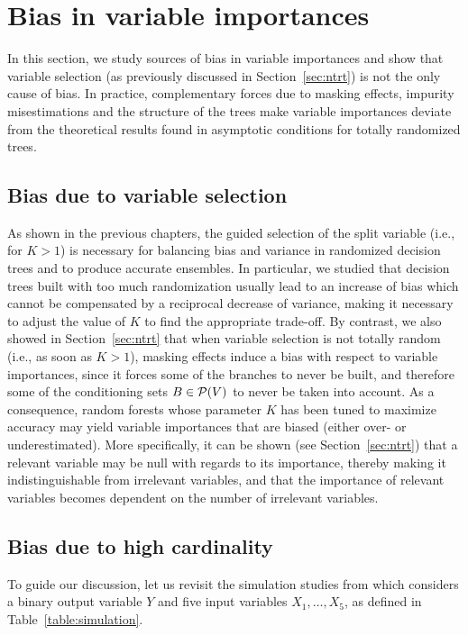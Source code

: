 \section{Bias in variable importances}
\label{sec:7:bias}

In this section, we study sources of bias in variable importances and show that
variable selection (as previously discussed in Section~\ref{sec:ntrt}) is  not
the only cause of bias. In practice, complementary forces due to masking
effects, impurity misestimations and the structure of the trees make variable
importances deviate from the theoretical results found in asymptotic conditions
for totally randomized trees.

\subsection{Bias due to variable selection}

As shown in the previous chapters, the guided selection of the split variable
(i.e., for $K>1$) is necessary for balancing bias and variance in  randomized
decision trees and to produce accurate ensembles. In particular, we studied
that decision trees built with too much randomization usually lead to an
increase of bias which cannot be compensated by a reciprocal decrease of
variance, making it necessary to adjust the value of $K$ to find the
appropriate trade-off. By contrast, we also showed in Section~\ref{sec:ntrt}
that when variable selection is not totally random (i.e., as soon as $K>1$),
masking effects induce a bias with respect to variable importances, since it
forces some of the branches to never be built, and therefore some of the
conditioning sets $B \in {\cal P}(V)$ to never be taken into account. As a
consequence, random forests whose parameter $K$ has been tuned to maximize
accuracy may yield variable importances that are biased (either
over- or underestimated). More specifically, it can be shown (see
Section~\ref{sec:ntrt}) that a relevant variable may be null with regards to
its importance, thereby making it indistinguishable from irrelevant variables,
and that the importance of relevant variables becomes dependent on the number
of irrelevant variables.

\subsection{Bias due to high cardinality}
\label{sec:7:bias:high}

To guide our discussion, let us revisit the simulation studies from
\citep{strobl:2007b} which considers a binary output variable $Y$ and five
input variables $X_1,\dots,X_5$, as defined in Table~\ref{table:simulation}.

